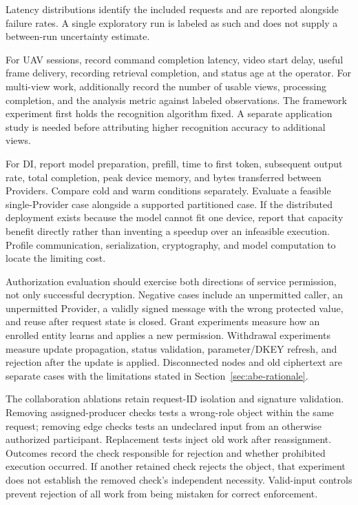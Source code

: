 Latency distributions identify the included requests and are reported alongside failure rates. A single exploratory run is labeled as such and does not supply a between-run uncertainty estimate.

For UAV sessions, record command completion latency, video start delay, useful frame delivery, recording retrieval completion, and status age at the operator. For multi-view work, additionally record the number of usable views, processing completion, and the analysis metric against labeled observations. The framework experiment first holds the recognition algorithm fixed. A separate application study is needed before attributing higher recognition accuracy to additional views.

For DI, report model preparation, prefill, time to first token, subsequent output rate, total completion, peak device memory, and bytes transferred between Providers. Compare cold and warm conditions separately. Evaluate a feasible single-Provider case alongside a supported partitioned case. If the distributed deployment exists because the model cannot fit one device, report that capacity benefit directly rather than inventing a speedup over an infeasible execution. Profile communication, serialization, cryptography, and model computation to locate the limiting cost.

Authorization evaluation should exercise both directions of service permission, not only successful decryption. Negative cases include an unpermitted caller, an unpermitted Provider, a validly signed message with the wrong protected value, and reuse after request state is closed. Grant experiments measure how an enrolled entity learns and applies a new permission. Withdrawal experiments measure update propagation, status validation, parameter/DKEY refresh, and rejection after the update is applied. Disconnected nodes and old ciphertext are separate cases with the limitations stated in Section~\ref{sec:abe-rationale}.

The collaboration ablations retain request-ID isolation and signature validation. Removing assigned-producer checks tests a wrong-role object within the same request; removing edge checks tests an undeclared input from an otherwise authorized participant. Replacement tests inject old work after reassignment. Outcomes record the check responsible for rejection and whether prohibited execution occurred. If another retained check rejects the object, that experiment does not establish the removed check's independent necessity. Valid-input controls prevent rejection of all work from being mistaken for correct enforcement.

